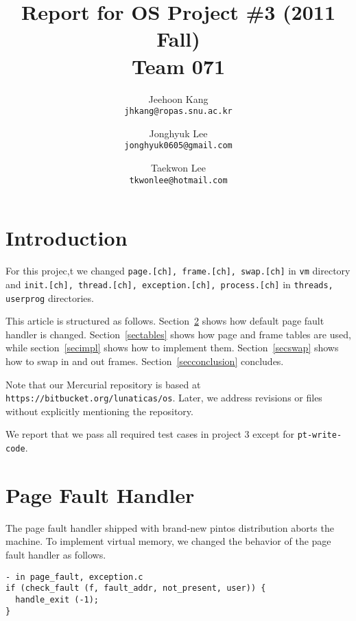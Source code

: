 \documentclass[a4paper,article,11pt,oneside]{article}
\begin{document}
\title{Report for OS Project \#3 (2011 Fall)\\Team 071}
\author{Jeehoon Kang\\\texttt{jhkang@ropas.snu.ac.kr}\and
  Jonghyuk Lee\\\texttt{jonghyuk0605@gmail.com} \and
  Taekwon Lee\\\texttt{tkwonlee@hotmail.com} }
\maketitle

\section{Introduction}
For this projec,t we changed \texttt{page.[ch], frame.[ch], swap.[ch]}
in \texttt{vm} directory and \texttt{init.[ch], thread.[ch],
  exception.[ch], process.[ch]} in \texttt{threads, userprog}
directories.

This article is structured as follows. Section~\ref{sechandler} shows
how default page fault handler is changed. Section~\ref{sectables}
shows how page and frame tables are used, while section~\ref{secimpl}
shows how to implement them. Section~\ref{secswap} shows how to swap
in and out frames. Section~\ref{secconclusion} concludes.

Note that our Mercurial repository is based at
\texttt{https://bitbucket.org/lunaticas/os}. Later, we address
revisions or files without explicitly mentioning the repository.

We report that we pass all required test cases in project 3 except for \texttt{pt-write-code}.

\section{Page Fault Handler}\label{sechandler}
The page fault handler shipped with brand-new pintos distribution
aborts the machine. To implement virtual memory, we changed the
behavior of the page fault handler as follows.

\begin{verbatim}
- in page_fault, exception.c
if (check_fault (f, fault_addr, not_present, user)) {
  handle_exit (-1);
}
\end{verbatim}
\end{document}
